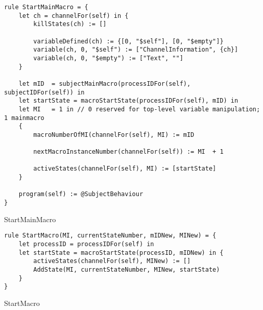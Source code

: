 \begin{listing}[H]
\begin{verbatim}
rule StartMainMacro = {
    let ch = channelFor(self) in {
        killStates(ch) := []

        variableDefined(ch) := {[0, "$self"], [0, "$empty"]}
        variable(ch, 0, "$self") := ["ChannelInformation", {ch}]
        variable(ch, 0, "$empty") := ["Text", ""]
    }

    let mID  = subjectMainMacro(processIDFor(self), subjectIDFor(self)) in
    let startState = macroStartState(processIDFor(self), mID) in
    let MI   = 1 in // 0 reserved for top-level variable manipulation; 1 mainmacro
    {
        macroNumberOfMI(channelFor(self), MI) := mID

        nextMacroInstanceNumber(channelFor(self)) := MI  + 1

        activeStates(channelFor(self), MI) := [startState]
    }

    program(self) := @SubjectBehaviour
}
\end{verbatim}
\caption{StartMainMacro}
\label{lst:asm:StartMainMacro}
\end{listing}




\begin{listing}[H]
\begin{verbatim}
rule StartMacro(MI, currentStateNumber, mIDNew, MINew) = {
    let processID = processIDFor(self) in
    let startState = macroStartState(processID, mIDNew) in {
        activeStates(channelFor(self), MINew) := []
        AddState(MI, currentStateNumber, MINew, startState)
    }
}
\end{verbatim}
\caption{StartMacro}
\label{lst:asm:StartMacro}
\end{listing}





